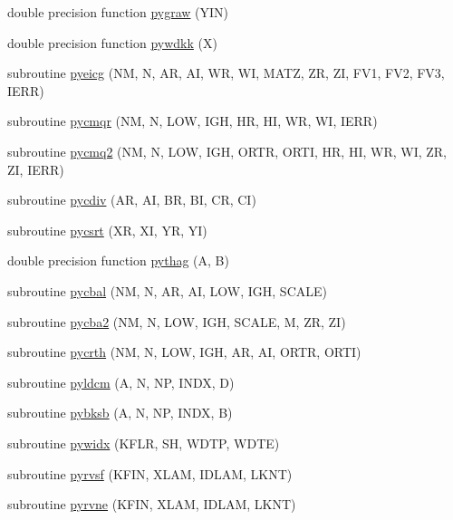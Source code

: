 \begin{DoxyCompactItemize}
\item 
double precision function \hyperlink{pythia-6_84_824_8f_a1fbed028d71b3534800710e4cb3ece4c}{pygraw} (Y\+IN)
\item 
double precision function \hyperlink{pythia-6_84_824_8f_ac294a21a6c81f3eb018f2b493dd409fc}{pywdkk} (X)
\item 
subroutine \hyperlink{pythia-6_84_824_8f_a06f88a031d752be8caffae474a959a6f}{pyeicg} (NM, N, AR, AI, WR, WI, M\+A\+TZ, ZR, ZI, F\+V1, F\+V2, F\+V3, I\+E\+RR)
\item 
subroutine \hyperlink{pythia-6_84_824_8f_a13d9dca91a2ba931501b34c8d124f207}{pycmqr} (NM, N, L\+OW, I\+GH, HR, HI, WR, WI, I\+E\+RR)
\item 
subroutine \hyperlink{pythia-6_84_824_8f_a221a1006fd5f50c86615e419ce6a5c67}{pycmq2} (NM, N, L\+OW, I\+GH, O\+R\+TR, O\+R\+TI, HR, HI, WR, WI, ZR, ZI, I\+E\+RR)
\item 
subroutine \hyperlink{pythia-6_84_824_8f_ab6dc09395d1c9190db8e6b5a3c8af3af}{pycdiv} (AR, AI, BR, BI, CR, CI)
\item 
subroutine \hyperlink{pythia-6_84_824_8f_a26a8a92473a9eb985c72ec3c132f7b85}{pycsrt} (XR, XI, YR, YI)
\item 
double precision function \hyperlink{pythia-6_84_824_8f_ac7f36e7a75160e5ab83eae9147120bd1}{pythag} (A, B)
\item 
subroutine \hyperlink{pythia-6_84_824_8f_a91f56276e55e79b691dcf7a9b7d52dae}{pycbal} (NM, N, AR, AI, L\+OW, I\+GH, S\+C\+A\+LE)
\item 
subroutine \hyperlink{pythia-6_84_824_8f_a4bf2dad3f00ccb67ad7770282f83c36e}{pycba2} (NM, N, L\+OW, I\+GH, S\+C\+A\+LE, M, ZR, ZI)
\item 
subroutine \hyperlink{pythia-6_84_824_8f_a0d0725449c106999235e1a804c22e4e1}{pycrth} (NM, N, L\+OW, I\+GH, AR, AI, O\+R\+TR, O\+R\+TI)
\item 
subroutine \hyperlink{pythia-6_84_824_8f_a465ce78bf5535730bbe484acfcdb5574}{pyldcm} (A, N, NP, I\+N\+DX, D)
\item 
subroutine \hyperlink{pythia-6_84_824_8f_a67f01dfbb9f068146c6823e5df8822de}{pybksb} (A, N, NP, I\+N\+DX, B)
\item 
subroutine \hyperlink{pythia-6_84_824_8f_a62d5cd78a67f9f9a83ba37293a56e95c}{pywidx} (K\+F\+LR, SH, W\+D\+TP, W\+D\+TE)
\item 
subroutine \hyperlink{pythia-6_84_824_8f_aa77e2a4f89c76ba674ab9cac330ec8cd}{pyrvsf} (K\+F\+IN, X\+L\+AM, I\+D\+L\+AM, L\+K\+NT)
\item 
subroutine \hyperlink{pythia-6_84_824_8f_af64d7b9f2943cb831c935b51901191a5}{pyrvne} (K\+F\+IN, X\+L\+AM, I\+D\+L\+AM, L\+K\+NT)

\end{DoxyCompactItemize}
